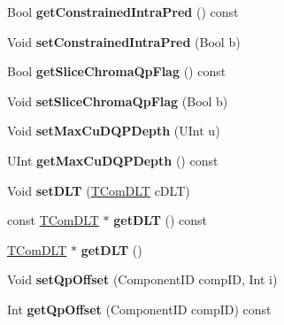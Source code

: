 \begin{DoxyCompactItemize}
\mbox{\label{class_t_com_p_p_s_a2899b94adbec4d226f830e23977b3f5f}} 
Bool {\bfseries get\+Constrained\+Intra\+Pred} () const
\item 
\mbox{\label{class_t_com_p_p_s_a90f0fd555759c0a63dc6f12e5073755d}} 
Void {\bfseries set\+Constrained\+Intra\+Pred} (Bool b)
\item 
\mbox{\label{class_t_com_p_p_s_a04e616598cde47aefddd06b3fd9937a7}} 
Bool {\bfseries get\+Slice\+Chroma\+Qp\+Flag} () const
\item 
\mbox{\label{class_t_com_p_p_s_a1d1abc453dda299c21f3bf7fae8fa4a7}} 
Void {\bfseries set\+Slice\+Chroma\+Qp\+Flag} (Bool b)
\item 
\mbox{\label{class_t_com_p_p_s_a08bec7abe5fe60da0b506a06217255e4}} 
Void {\bfseries set\+Max\+Cu\+D\+Q\+P\+Depth} (U\+Int u)
\item 
\mbox{\label{class_t_com_p_p_s_abc6eadf089950d66ade8d84fe1af2d78}} 
U\+Int {\bfseries get\+Max\+Cu\+D\+Q\+P\+Depth} () const
\item 
\mbox{\label{class_t_com_p_p_s_a6d32176f26bdf85adaab0215a4db9a7d}} 
Void {\bfseries set\+D\+LT} (\hyperlink{class_t_com_d_l_t}{T\+Com\+D\+LT} c\+D\+LT)
\item 
\mbox{\label{class_t_com_p_p_s_a6432407c2047a8fe9f929c87bc6401a4}} 
const \hyperlink{class_t_com_d_l_t}{T\+Com\+D\+LT} $\ast$ {\bfseries get\+D\+LT} () const
\item 
\mbox{\label{class_t_com_p_p_s_a2fe7d97798eb69474f855840bfbd4681}} 
\hyperlink{class_t_com_d_l_t}{T\+Com\+D\+LT} $\ast$ {\bfseries get\+D\+LT} ()
\item 
\mbox{\label{class_t_com_p_p_s_a02b9dfbb6c8ed6955f628c6394fcd5e7}} 
Void {\bfseries set\+Qp\+Offset} (Component\+ID comp\+ID, Int i)
\item 
\mbox{\label{class_t_com_p_p_s_a59a9369813a3cbc005afb62231457aa7}} 
Int {\bfseries get\+Qp\+Offset} (Component\+ID comp\+ID) const

\end{DoxyCompactItemize}
